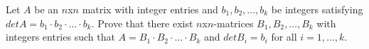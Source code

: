 Let \(A\) be an \(n\)x\(n\) matrix with integer entries and \(b_{1},b_{2},\dots,b_{k}\) be integers satisfying \(detA=b_{1}\cdot b_{2}\cdot \dots\cdot b_{k}\). Prove that there exist \(n\)x\(n\)-matrices \(B_{1},B_{2},\dots,B_{k}\) with integers entries such that \(A=B_{1}\cdot B_{2}\cdot \dots\cdot B_{k}\) and \(detB_{i}=b_{i}\) for all \(i=1,\dots,k\).